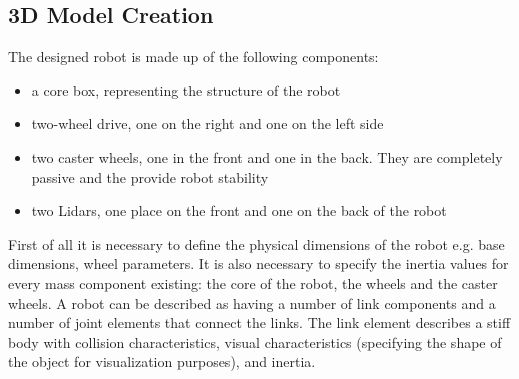 \subsection{3D Model Creation}
The designed robot is made up of the following components:
\begin{itemize}
    \item a core box, representing the structure of the robot
    \item two-wheel drive, one on the right and one on the left side 
    \item two caster wheels, one in the front and one in the back. They are completely passive and the provide robot stability
    \item two Lidars, one place on the front and one on the back of the robot
\end{itemize}
First of all it is necessary to define the physical dimensions of the robot e.g. base dimensions, wheel parameters.
It is also necessary to specify the inertia values for every mass component existing: the core of the robot, the wheels and the caster wheels.
A robot can be described as having a number of link components and a number of joint elements that connect the links. The link element describes a stiff body with collision characteristics, visual characteristics (specifying the shape of the object for visualization purposes), and inertia.

